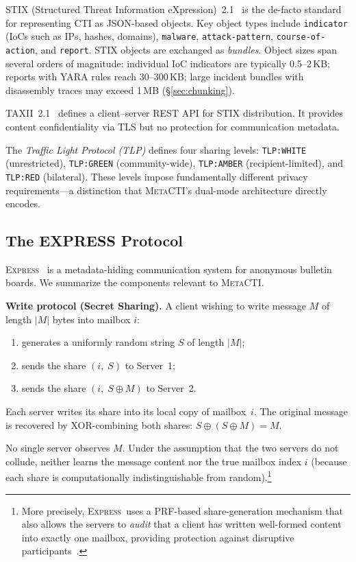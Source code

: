 \documentclass[letterpaper,twocolumn,10pt]{article}
\newcommand{\metacti}{\textsc{MetaCTI}}
\newcommand{\express}{\textsc{Express}}
\newcommand{\tlp}[1]{\texttt{TLP:#1}}
\newcommand{\xorb}{\oplus}
\begin{document}
STIX (Structured Threat Information eXpression)~2.1~\cite{stix21} is
the de-facto standard for representing CTI as JSON-based objects.
Key object types include \texttt{indicator} (IoCs such as IPs, hashes,
domains), \texttt{malware}, \texttt{attack-pattern}, \texttt{course-of-action},
and \texttt{report}. STIX objects are exchanged as \emph{bundles}.
Object sizes span several orders of magnitude:
individual IoC indicators are typically 0.5–2\,KB;
reports with YARA rules reach 30–300\,KB;
large incident bundles with disassembly traces may exceed 1\,MB
(\S\ref{sec:chunking}).

TAXII~2.1~\cite{taxii21} defines a client–server REST API for STIX
distribution. It provides content confidentiality via TLS but no
protection for communication metadata.

The \emph{Traffic Light Protocol (TLP)} defines four sharing levels:
\tlp{WHITE} (unrestricted), \tlp{GREEN} (community-wide),
\tlp{AMBER} (recipient-limited), and \tlp{RED} (bilateral).
These levels impose fundamentally different privacy requirements—a
distinction that \metacti's dual-mode architecture directly encodes.

\subsection{The EXPRESS Protocol}
\label{sec:express}

\express~\cite{eskandarian2021express} is a metadata-hiding
communication system for anonymous bulletin boards. We summarize the
components relevant to \metacti.

\textbf{Write protocol (Secret Sharing).}
A client wishing to write message $M$ of length $|M|$ bytes into
mailbox $i$:
\begin{enumerate}[nosep]
  \item generates a uniformly random string $S$ of length $|M|$;
  \item sends the share $(i,\; S)$ to Server~1;
  \item sends the share $(i,\; S \xorb M)$ to Server~2.
\end{enumerate}
Each server writes its share into its local copy of mailbox~$i$.
The original message is recovered by XOR-combining both shares:
$S \xorb (S \xorb M) = M$.

No single server observes $M$. Under the assumption that the two
servers do not collude, neither learns the message content nor the
true mailbox index $i$ (because each share is computationally
indistinguishable from random).\footnote{More precisely, \express\
uses a PRF-based share-generation mechanism that also allows the servers
to \emph{audit} that a client has written well-formed content into
exactly one mailbox, providing protection against disruptive
participants~\cite{corrigan2015riposte}.}
\end{document}
